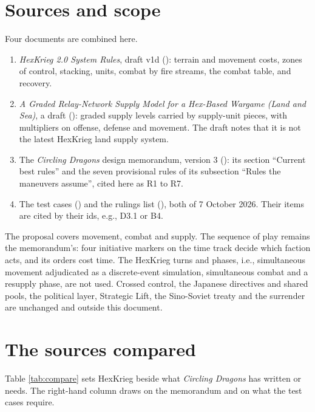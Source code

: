 \documentclass[11pt]{article}
\begin{document}
\section{Sources and scope}\label{sec:sources}
Four documents are combined here.
\begin{enumerate}
\item \emph{HexKrieg 2.0 System Rules}, draft v1d (): terrain and movement costs, zones of control, stacking, units, combat by fire streams, the combat table, and recovery.
\item \emph{A Graded Relay-Network Supply Model for a Hex-Based Wargame (Land and Sea)}, a draft (): graded supply levels carried by supply-unit pieces, with multipliers on offense, defense and movement. The draft notes that it is not the latest HexKrieg land supply system.
\item The \emph{Circling Dragons} design memorandum, version 3 (): its section ``Current best rules'' and the seven provisional rules of its subsection ``Rules the maneuvers assume'', cited here as R1 to R7.
\item The test cases () and the rulings list (), both of 7 October 2026. Their items are cited by their ids, e.g., D3.1 or B4.
\end{enumerate}
The proposal covers movement, combat and supply. The sequence of play remains the memorandum's: four initiative markers on the time track decide which faction acts, and its orders cost time. The HexKrieg turns and phases, i.e., simultaneous movement adjudicated as a discrete-event simulation, simultaneous combat and a resupply phase, are not used. Crossed control, the Japanese directives and shared pools, the political layer, Strategic Lift, the Sino-Soviet treaty and the surrender are unchanged and outside this document.

\section{The sources compared}\label{sec:compare}
Table \ref{tab:compare} sets HexKrieg beside what \emph{Circling Dragons} has written or needs. The right-hand column draws on the memorandum and on what the test cases require.
\end{document}
